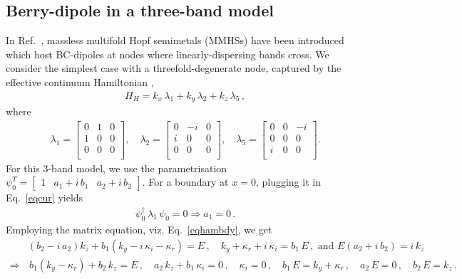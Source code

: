\documentclass[aps,prb,onecolumn, footinbib, 10pt]{revtex4-2}
\def \nn{\nonumber \\}
\begin{document}
\subsection{Berry-dipole in a three-band model}

In Ref.~\cite{graf-hopf}, massless multifold Hopf semimetals (MMHSs) have been introduced which host BC-dipoles at nodes where linearly-dispersing bands cross. We consider the simplest case with a threefold-degenerate node, captured by the effective continuum Hamiltonian \cite{graf-hopf, hopf2, hopf3},
\begin{align}
\label{eqbcd2}
H_{H} = k_x \,\lambda_1 + k_y \,\lambda_2+ k_z\,\lambda_5\,,
\end{align}
where
\begin{align}
\lambda_1 =  \begin{bmatrix}
 0 & 1 & 0 \\
 1 & 0 & 0 \\
 0 & 0 & 0 \\
\end{bmatrix}, \quad
\lambda_2 = \begin{bmatrix}
 0 & -i & 0 \\
 i & 0 & 0 \\
 0 & 0 & 0 \\
\end{bmatrix}, \quad
\lambda_5 = \begin{bmatrix}
 0 & 0 & -i \\
 0 & 0 & 0 \\
 i & 0 & 0 \\
\end{bmatrix} .
\end{align}
For this 3-band model, we use the parametrisation $ \psi_0^T  = \begin{bmatrix}
1 & a_1 +i \, b_1 & a_2 + i\, b_2 \end{bmatrix}$. For a boundary at $x=0$, plugging it in Eq.~\eqref{eqcur} yields
\begin{align}
\psi_0^\dagger\, \lambda_1\, \psi_0 = 0 \Rightarrow a_1 = 0\,.
\end{align}
Employing the matrix equation, viz. Eq.~\eqref{eqhambdy}, we get
\begin{align}
& \left(b_2-i \,a_2\right) k_z+  b_1 \left( k_y -i  \,\kappa_i -\kappa _r\right) = E \,,
\quad k_y+\kappa_r + i \, \kappa_i = b_1 \, E \,, \text{ and }
E \left(a_2+i \,b_2\right)= i\, k_z \nn
\Rightarrow &\,  b_1 \left(k_y-\kappa_r\right)+b_2 \, k_z = E\,,\quad
a_2 \, k_z+b_1 \, \kappa_i = 0\,,\quad \kappa_i = 0 \,, \quad
b_1 \, E =  k_y+\kappa_r\,,\quad a_2\, E = 0\,,\quad b_2\, E = k_z\,.
\end{align}
\end{document}
